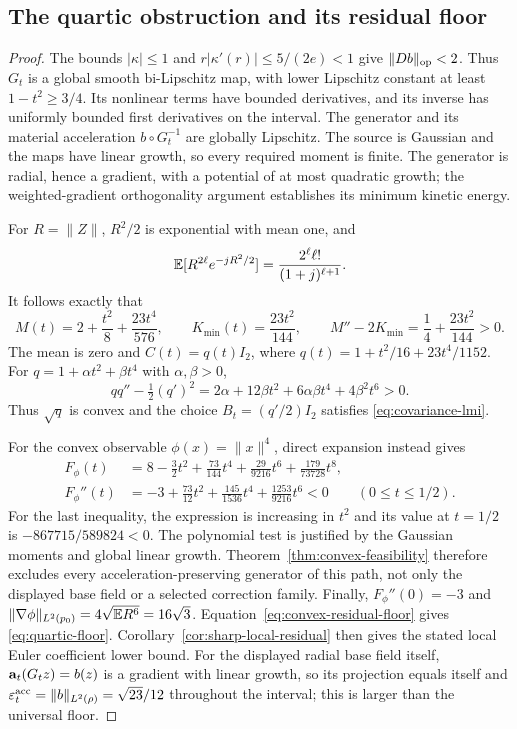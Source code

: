 \subsection{The quartic obstruction and its residual floor}
\begin{proof}
The bounds $|\kappa|\le1$ and
$r|\kappa'(r)|\le5/(2e)<1$ give $\|Db\|_{\rm op}<2$.
Thus $G_t$ is a global smooth bi-Lipschitz map, with lower Lipschitz
constant at least $1-t^2\ge3/4$.  Its nonlinear terms have bounded
derivatives, and its inverse has uniformly bounded first derivatives on
the interval.  The generator and its material acceleration
$b\circ G_t^{-1}$ are globally Lipschitz.  The source is Gaussian and the
maps have linear growth, so every required moment is finite.  The generator
is radial, hence a gradient, with a potential of at most quadratic growth;
the weighted-gradient orthogonality argument establishes its minimum
kinetic energy.

For $R=\|Z\|$, $R^2/2$ is exponential with mean one, and
\[
 \mathbb E[R^{2\ell}e^{-jR^2/2}]
 =\frac{2^\ell\ell!}{(1+j)^{\ell+1}}.
\]
It follows exactly that
\[
 M(t)=2+\frac{t^2}{8}+\frac{23t^4}{576},\qquad
 K_{\min}(t)=\frac{23t^2}{144},\qquad
 M''-2K_{\min}=\frac14+\frac{23t^2}{144}>0.
\]
The mean is zero and $C(t)=q(t)I_2$, where
$q(t)=1+t^2/16+23t^4/1152$.
For $q=1+\alpha t^2+\beta t^4$ with $\alpha,\beta>0$,
\[
 qq''-\tfrac12(q')^2
 =2\alpha+12\beta t^2+6\alpha\beta t^4+4\beta^2t^6>0.
\]
Thus $\sqrt q$ is convex and the choice $B_t=(q'/2)I_2$ satisfies
\eqref{eq:covariance-lmi}.

For the convex observable $\phi(x)=\|x\|^4$, direct expansion instead gives
\begin{align*}
 F_\phi(t)
 &=8-\frac32t^2+\frac{73}{144}t^4
       +\frac{29}{9216}t^6+\frac{179}{73728}t^8,\\
 F_\phi''(t)
 &=-3+\frac{73}{12}t^2+\frac{145}{1536}t^4
       +\frac{1253}{9216}t^6<0
       \qquad(0\le t\le1/2).
\end{align*}
For the last inequality, the expression is increasing in $t^2$ and its
value at $t=1/2$ is $-867715/589824<0$.
The polynomial test is justified by the Gaussian moments and global
linear growth.  Theorem~\ref{thm:convex-feasibility} therefore excludes
every acceleration-preserving generator of this path, not only the
displayed base field or a selected correction family.  Finally,
$F_\phi''(0)=-3$ and
$\|\nabla\phi\|_{L^2(p_0)}=4\sqrt{\mathbb E R^6}=16\sqrt3$.
Equation~\eqref{eq:convex-residual-floor} gives
\eqref{eq:quartic-floor}.  Corollary~\ref{cor:sharp-local-residual}
then gives the stated local Euler coefficient lower bound.  For the
displayed radial base field itself, $\mathbf a_t(G_tz)=b(z)$ is a gradient
with linear growth, so its projection equals itself and
$\varepsilon_t^{\rm acc}=\|b\|_{L^2(\rho)}=\sqrt{23}/12$
throughout the interval; this is larger than the universal floor.
\end{proof}
